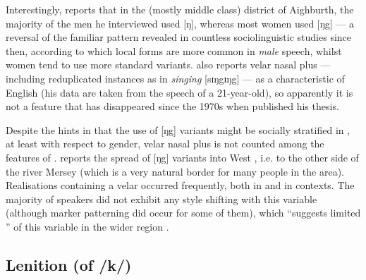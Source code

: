 Interestingly, \citeauthor{knowles1973} reports that in the (mostly middle class) district of Aighburth, the majority of the men he interviewed used [ŋ], whereas most women used [ŋg] \citeyearpar[cf.][295]{knowles1973} --- a reversal of the familiar pattern revealed in countless sociolinguistic studies since then, according to which local forms are more common in \emph{male} speech, whilst women tend to use more standard variants.
\citet[352]{watson2007} also reports velar nasal plus --- including reduplicated instances as in \emph{singing} [sɪŋgɪŋg] --- as a characteristic of  English (his data are taken from the speech of a 21-year-old), so apparently it is not a feature that has disappeared since the 1970s when \citeauthor{knowles1973} published his thesis.

Despite the hints in \textcite{knowles1973} that the use of [ŋg] variants might be socially stratified in , at least with respect to gender, velar nasal plus is not counted among the  features of .
\textcite[98]{newbrook1999} reports the spread of [ŋg] variants into West , i.e. to the other side of the river Mersey (which is a very  natural border for many people in the area).
Realisations containing a velar  occurred frequently, both in  and in  contexts.
The majority of speakers did not exhibit any style shifting with this variable (although marker patterning did occur for some of them), which ``suggests limited '' of this variable in the wider  region \parencite[98]{newbrook1999}.

		\subsection{Lenition (of /k/)}\label{sec.var.con.len}


